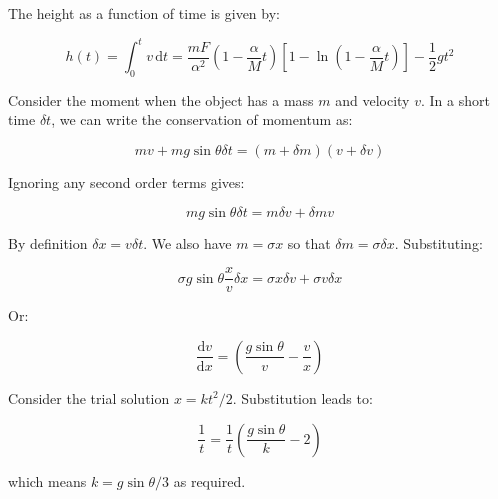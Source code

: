 \documentclass[12pt]{article}
\begin{document}
The height as a function of time is given by:

\begin{equation}
    h(t) = \int_{0}^{t} v \, \mathrm{d}t = \frac{mF}{\alpha^{2}} \left( 1 - \frac{\alpha}{M}t \right) \left[ 1 - \ln{\left( 1 - \frac{\alpha}{M}t \right)} \right] - \frac{1}{2}gt^{2}
\end{equation}

Consider the moment when the object has a mass $m$ and velocity $v$. In a short time $\delta t$, we can write the conservation of momentum as:

\begin{equation}
    mv + mg \sin{\theta} \delta t = (m + \delta m)(v + \delta v)
\end{equation}

Ignoring any second order terms gives:

\begin{equation}
    mg \sin{\theta} \delta t = m \delta v + \delta m v
\end{equation}

By definition $\delta x = v \delta t$. We also have $m = \sigma x$ so that $\delta m = \sigma \delta x$. Substituting:

\begin{equation}
    \sigma g \sin{\theta} \frac{x}{v} \delta x = \sigma x \delta v + \sigma v \delta x
\end{equation}

Or:

\begin{equation}
\frac{\mathrm{d}v}{\mathrm{d}x} = \left( \frac{g \sin{\theta}}{v} - \frac{v}{x} \right)
\end{equation}

Consider the trial solution $x = kt^{2}/2$. Substitution leads to:

\begin{equation}
    \frac{1}{t} = \frac{1}{t} \left( \frac{g \sin{\theta}}{k} - 2 \right)
\end{equation}

which means $k = g\sin{\theta}/3$ as required.
\end{document}
